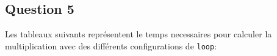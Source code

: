 \documentclass{article}
\begin{document}
\newpage\subsection*{Question 5}
\begin{resolution}
    Les tableaux suivants représentent le temps necessaires pour calculer la multiplication avec des différents configurations de \texttt{loop}:
    \begin{center}
        \begin{minipage}[b]{0.3\textwidth}
        \end{minipage}
        \begin{minipage}[b]{0.3\textwidth}
        \end{minipage}
        \begin{minipage}[b]{0.3\textwidth}
        \end{minipage}
    \end{center}


\end{resolution}
\end{document}
